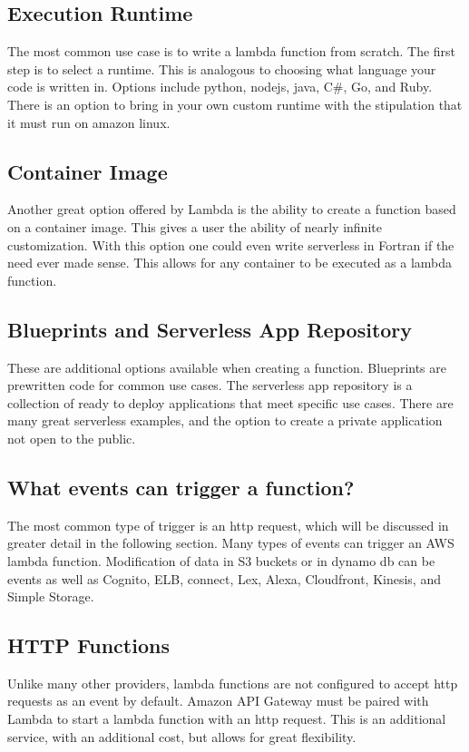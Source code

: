 \documentclass[10pt, conference]{IEEEtran}
\begin{document}
\subsection{Execution Runtime}

The most common use case is to write a lambda function from scratch. The first step is to select a runtime. This is analogous to choosing what language your code is written in. Options include python, nodejs, java, C\#, Go, and Ruby. There is an option to bring in your own custom runtime with the stipulation that it must run on amazon linux.

\subsection{Container Image}
Another great option offered by Lambda is the ability to create a function based on a container image. This gives a user the ability of nearly infinite customization. With this option one could even write serverless in Fortran if the need ever made sense. This allows for any container to be executed as a lambda function. 

\subsection{Blueprints and Serverless App Repository}
These are additional options available when creating a function. Blueprints are prewritten code for common use cases. The serverless app repository is a collection of ready to deploy applications that meet specific use cases. There are many great serverless examples, and the option to create a private application not open to the public. 

\subsection{What events can trigger a function?}
The most common type of trigger is an http request, which will be discussed in greater detail in the following section. Many types of events can trigger an AWS lambda function. Modification of data in S3 buckets or in dynamo db can be events as well as Cognito, ELB, connect, Lex, Alexa, Cloudfront, Kinesis, and Simple Storage. 

\subsection{HTTP Functions}
Unlike many other providers, lambda functions are not configured to accept http requests as an event by default. Amazon API Gateway must be paired with Lambda to start a lambda function with an http request. This is an additional service, with an additional cost, but allows for great flexibility.
\end{document}
